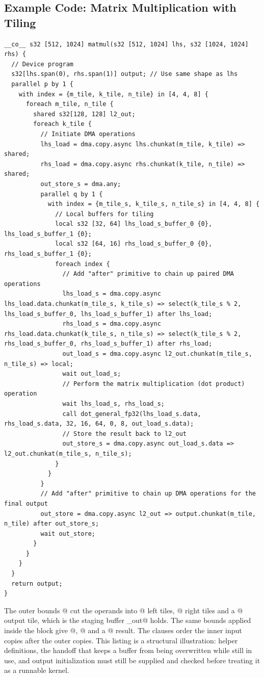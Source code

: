 \subsection*{Example Code: Matrix Multiplication with Tiling}

\begin{lstlisting}[language=croqtile,caption={Example Code: Matrix Multiplication with Tiling}]
__co__ s32 [512, 1024] matmul(s32 [512, 1024] lhs, s32 [1024, 1024] rhs) {
  // Device program
  s32[lhs.span(0), rhs.span(1)] output; // Use same shape as lhs
  parallel p by 1 {
    with index = {m_tile, k_tile, n_tile} in [4, 4, 8] {
      foreach m_tile, n_tile {
        shared s32[128, 128] l2_out;
        foreach k_tile {
          // Initiate DMA operations
          lhs_load = dma.copy.async lhs.chunkat(m_tile, k_tile) => shared;
          rhs_load = dma.copy.async rhs.chunkat(k_tile, n_tile) => shared;
          out_store_s = dma.any;
          parallel q by 1 {
            with index = {m_tile_s, k_tile_s, n_tile_s} in [4, 4, 8] {
              // Local buffers for tiling
              local s32 [32, 64] lhs_load_s_buffer_0 {0}, lhs_load_s_buffer_1 {0};
              local s32 [64, 16] rhs_load_s_buffer_0 {0}, rhs_load_s_buffer_1 {0};
              foreach index {
                // Add "after" primitive to chain up paired DMA operations
                lhs_load_s = dma.copy.async lhs_load.data.chunkat(m_tile_s, k_tile_s) => select(k_tile_s % 2, lhs_load_s_buffer_0, lhs_load_s_buffer_1) after lhs_load;
                rhs_load_s = dma.copy.async rhs_load.data.chunkat(k_tile_s, n_tile_s) => select(k_tile_s % 2, rhs_load_s_buffer_0, rhs_load_s_buffer_1) after rhs_load;
                out_load_s = dma.copy.async l2_out.chunkat(m_tile_s, n_tile_s) => local;
                wait out_load_s;
                // Perform the matrix multiplication (dot product) operation
                wait lhs_load_s, rhs_load_s;
                call dot_general_fp32(lhs_load_s.data, rhs_load_s.data, 32, 16, 64, 0, 8, out_load_s.data);
                // Store the result back to l2_out
                out_store_s = dma.copy.async out_load_s.data => l2_out.chunkat(m_tile_s, n_tile_s);
              }
            }
          }
          // Add "after" primitive to chain up DMA operations for the final output
          out_store = dma.copy.async l2_out => output.chunkat(m_tile, n_tile) after out_store_s;
          wait out_store;
        }
      }
    }
  }
  return output;
}
\end{lstlisting}

The outer bounds \co@[4, 4, 8]@ cut the operands into \co@[128, 256]@ left tiles, \co@[256, 128]@ right tiles and a \co@[128, 128]@ output tile, which is the staging buffer _out@ holds. The same bounds applied inside the block give \co@[32, 64]@, \co@[64, 16]@ and a \co@[32, 16]@ result. The \co@after@ clauses order the inner input copies after the outer copies. This listing is a structural illustration: helper definitions, the handoff that keeps a buffer from being overwritten while still in use, and output initialization must still be supplied and checked before treating it as a runnable kernel.

